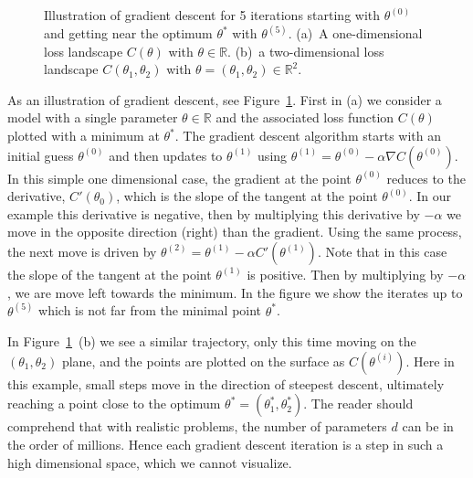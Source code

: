 \documentclass[12pt]{article}
\begin{document}
\begin{figure}[h!]
\begin{subfigure}[b]{0.5\linewidth}
    \caption{} 
    \vspace{2ex}
  \end{subfigure} 
    \caption{Illustration of gradient descent for 5 iterations starting with $\theta^{(0)}$ and getting near the optimum $\theta^*$ with $\theta^{(5)}$. (a)~A one-dimensional loss landscape $C(\theta)$ with $\theta \in \mathbb{R}$. (b)~a two-dimensional loss landscape $C(\theta_1,\theta_2)$ with $\theta = (\theta_1, \theta_2) \in \mathbb{R}^2$.}
    \label{simpleloss}
\end{figure}

As an illustration of gradient descent, see Figure~\ref{simpleloss}. First in (a) we consider a  model with a single parameter $\theta \in \mathbb{R}$ and the associated loss function $C(\theta)$ plotted with a minimum at $\theta^*$.  The gradient descent algorithm starts with an initial guess $\theta^{(0)}$ and then updates to $\theta^{(1)}$ using $\theta^{(1)} = \theta^{(0)} - \alpha \nabla C(\theta^{(0)})$. In this simple one dimensional case, the gradient at the point $\theta^{(0)}$ reduces to the derivative, $C'(\theta_0)$, which is the slope of the tangent at the point $\theta^{(0)}$. In our example this derivative is negative, then by multiplying this derivative by $-\alpha$ we move in the opposite direction (right) than the gradient. Using the same process, the next move is driven by $\theta^{(2)} = \theta^{(1)} - \alpha  C'(\theta^{(1)})$. Note that in this case the slope of the tangent at the point $\theta^{(1)}$ is positive. Then by multiplying by $- \alpha $, we are move left towards the minimum. In the figure we show the iterates up to $\theta^{(5)}$ which is not far from the minimal point $\theta^*$.

In Figure~\ref{simpleloss}~(b) we see a similar trajectory, only this time moving on the $(\theta_1, \theta_2)$ plane, and the points are plotted on the surface as $C(\theta^{(i)})$. Here in this example, small steps move in the direction of steepest descent, ultimately reaching a point close to the optimum $\theta^* = (\theta_1^*, \theta_2^*)$. The reader should comprehend that with realistic problems, the number of parameters $d$ can be in the order of millions. Hence each gradient descent iteration is a step in such a high dimensional space, which we cannot visualize. 
\end{document}
